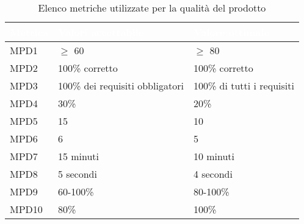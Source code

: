 \renewcommand{\arraystretch}{1.5}
\begin{longtable}{C{2.5cm} C{4cm} C{4cm}}
\textcolor{white}{\textbf{Metrica}}&
\textcolor{white}{\textbf{Valori accettabile}}&
\textcolor{white}{\textbf{Valore ottimale}}\\	
\endhead
\endfoot
{}\caption{Elenco metriche utilizzate per la qualità del prodotto}
\endlastfoot
		MPD1 &  
		$\geq$ 60 & 
		$\geq$ 80\\
		MPD2 & 
		100\% corretto & 
		100\% corretto \\
		MPD3 & 
		100\% dei requisiti obbligatori &
		100\% di tutti i requisiti \\
		MPD4 &  
		30\% &
		20\% \\
		MPD5 &  
		15 &
		10 \\
		MPD6 &  
		6 &
		5 \\
		MPD7 &  
		15 minuti &
		10 minuti\\
		MPD8 &  
		5 secondi &
		4 secondi \\
		MPD9 &  
		60-100\% &
		80-100\% \\
		MPD10 &  
		80\% &
		100\% \\
\end{longtable}